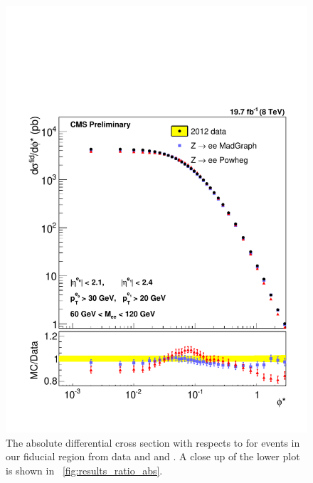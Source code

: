 \begin{figure}[!p]
    \centering
    \includegraphics[width=\textwidth]{figures/ZShape_elec_Abs_Dressed.pdf}
    \caption[
        The absolute differential cross section with respects to \phistar for
        \Ztoee events in our fiducial region from data and \MADGRAPH and
        \POWHEG.
    ]{
        The absolute differential cross section with respects to \phistar for
        \Ztoee events in our fiducial region from data and \MADGRAPH and
        \POWHEG. A close up of the lower plot is shown in
        \FIG~\ref{fig:results_ratio_abs}.
    }
    \label{fig:results_abs}
\end{figure}

